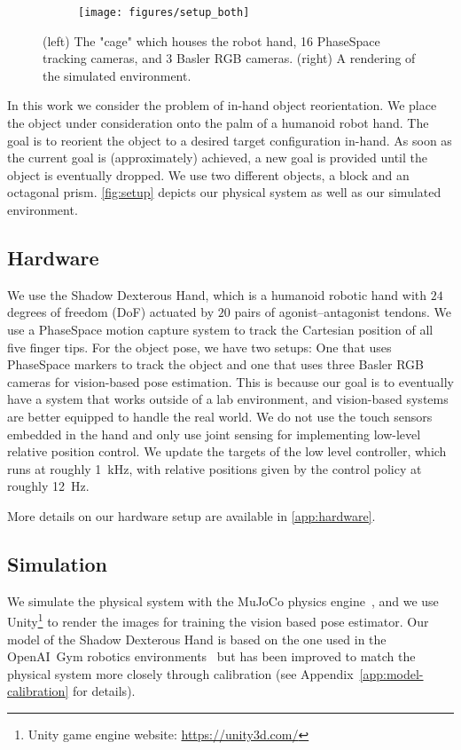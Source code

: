 
\begin{figure}
    \centering
    \begin{subfigure}[b]{\textwidth}
        \centering
        \texttt{[image: figures/setup\_both]}
    \end{subfigure}%
    \caption{(left) The "cage" which houses the robot hand, 16 PhaseSpace tracking cameras, and 3 Basler RGB cameras. (right) A rendering of the simulated environment.
    }
    \label{fig:setup}
\end{figure}

In this work we consider the problem of in-hand object reorientation.
We place the object under consideration onto the palm of a humanoid robot hand.
The goal is to reorient the object to a desired target configuration in-hand.
As soon as the current goal is (approximately) achieved, a new goal is provided until the object is eventually dropped.
We use two different objects, a block and an octagonal prism.
\autoref{fig:setup} depicts our physical system as well as our simulated environment.


\subsection{Hardware}

We use the Shadow Dexterous Hand, which is a humanoid robotic hand with $24$ degrees of freedom (DoF) actuated by $20$ pairs of agonist--antagonist tendons.
We use a PhaseSpace motion capture system to track the Cartesian position of all five finger tips.
For the object pose, we have two setups: One that uses PhaseSpace markers to track the object and one that uses three Basler RGB cameras for vision-based pose estimation.
This is because our goal is to eventually have a system that works outside of a lab environment, and vision-based systems are better equipped to handle the real world.
We do not use the touch sensors embedded in the hand and only use joint sensing for implementing low-level relative position control. We update the targets of the low level controller, which runs at roughly \SI{1}{kHz}, with relative positions given by the control policy at roughly \SI{12}{Hz}.




More details on our hardware setup are available in \autoref{app:hardware}.

\subsection{Simulation}
We simulate the physical system with the MuJoCo physics engine~\citep{MuJoCo}, and we use Unity\footnote{Unity game engine website: \url{https://unity3d.com/}} to render the images
for training the vision based pose estimator. Our model of the Shadow Dexterous Hand is based on the one used in the OpenAI~Gym robotics environments~\citep{plappert2018multi} but has been improved to match the physical system more closely through calibration (see Appendix~\ref{app:model-calibration} for details).

